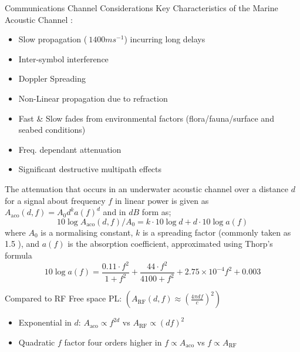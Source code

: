 \documentclass{beamer}
\begin{document}
\begin{frame}[allowframebreaks]{Communications Channel Considerations}
  Key Characteristics of the Marine Acoustic Channel \autocite{Urick1983,Partan2006,Stojanovic2007,Stefanov2011}:
  \begin{itemize}
    \item Slow propagation ($~1400ms^{-1}$) incurring long delays
    \item Inter-symbol interference
    \item Doppler Spreading
    \item Non-Linear propagation due to refraction
    \item Fast \& Slow fades from environmental factors (flora/fauna/surface and seabed conditions)
    \item Freq. dependant attenuation
    \item Significant destructive multipath effects
  \end{itemize}
  
  \framebreak

  The attenuation that occurs in an underwater acoustic channel over a distance $d$ for a signal about frequency $f$ in linear power is given as $A_{\text{aco}}(d,f) = A_0d^ka(f)^d$ and in $dB$ form as;
  \begin{equation}
    \label{eq:acoattenuationdb}
    10 \log A_{\text{aco}}(d,f)/A_0 = k \cdot 10 \log d + d \cdot 10 \log a(f)
  \end{equation}
  where $A_0$ is a normalising constant, $k$ is a spreading factor (commonly taken as 1.5  \autocite{Stojanovic2007}), and $a(f)$ is the absorption coefficient, approximated using Thorp's formula \autocite{Stefanov2011}
  \begin{equation}
    \label{eq:thorp}
    10 \log a(f) = \frac{0.11 \cdot f^2}{1+f^2} + \frac{44\cdot f^2}{4100+f^2}+ 2.75\times10^{-4} f^2 + 0.003
  \end{equation}

  \framebreak

  Compared to RF Free space PL: $(A_{\text{RF}}(d,f) \approx \left( \frac{4\pi d f}{c} \right)^2)$
  \begin{itemize}
    \item Exponential in $d$: $A_{\text{aco}} \propto f^{2d}$ vs $A_{\text{RF}} \propto (df)^2$
    \item Quadratic $f$ factor four orders higher in $f\propto A_{\text{aco}}$ vs $f\propto A_{\text{RF}}$

  \end{itemize}
  
\end{frame}
\end{document}
